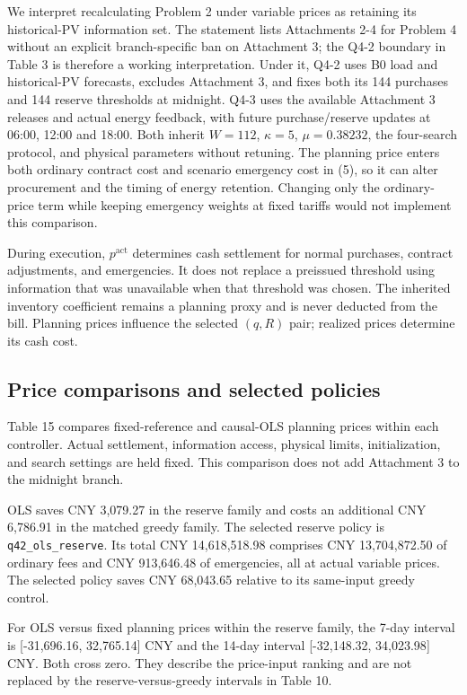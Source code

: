 We interpret recalculating Problem 2 under variable prices as retaining its historical-PV information set. The statement lists Attachments 2-4 for Problem 4 without an explicit branch-specific ban on Attachment 3; the Q4-2 boundary in Table 3 is therefore a working interpretation. Under it, Q4-2 uses B0 load and historical-PV forecasts, excludes Attachment 3, and fixes both its 144 purchases and 144 reserve thresholds at midnight. Q4-3 uses the available Attachment 3 releases and actual energy feedback, with future purchase/reserve updates at 06:00, 12:00 and 18:00. Both inherit \(W=112\), \(\kappa=5\), \(\mu=0.38232\), the four-search protocol, and physical parameters without retuning. The planning price enters both ordinary contract cost and scenario emergency cost in (5), so it can alter procurement and the timing of energy retention. Changing only the ordinary-price term while keeping emergency weights at fixed tariffs would not implement this comparison.

During execution, \(p^{\mathrm{act}}\) determines cash settlement for normal purchases, contract adjustments, and emergencies. It does not replace a preissued threshold using information that was unavailable when that threshold was chosen. The inherited inventory coefficient remains a planning proxy and is never deducted from the bill. Planning prices influence the selected \((q,R)\) pair; realized prices determine its cash cost.

\subsection{Price comparisons and selected policies}\label{price-comparisons-and-selected-policies}

Table 15 compares fixed-reference and causal-OLS planning prices within each controller. Actual settlement, information access, physical limits, initialization, and search settings are held fixed. This comparison does not add Attachment 3 to the midnight branch.

OLS saves CNY 3,079.27 in the reserve family and costs an additional CNY 6,786.91 in the matched greedy family. The selected reserve policy is \nolinkurl{q42_ols_reserve}. Its total CNY 14,618,518.98 comprises CNY 13,704,872.50 of ordinary fees and CNY 913,646.48 of emergencies, all at actual variable prices. The selected policy saves CNY 68,043.65 relative to its same-input greedy control.

For OLS versus fixed planning prices within the reserve family, the 7-day interval is {[}-31,696.16, 32,765.14{]} CNY and the 14-day interval {[}-32,148.32, 34,023.98{]} CNY. Both cross zero. They describe the price-input ranking and are not replaced by the reserve-versus-greedy intervals in Table 10.

